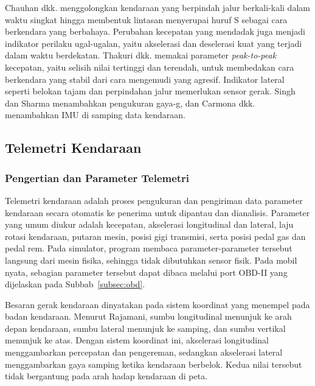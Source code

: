 Chauhan dkk. menggolongkan kendaraan yang berpindah jalur berkali-kali dalam waktu singkat hingga membentuk lintasan menyerupai huruf S sebagai cara berkendara yang berbahaya. Perubahan kecepatan yang mendadak juga menjadi indikator perilaku ugal-ugalan, yaitu akselerasi dan deselerasi kuat yang terjadi dalam waktu berdekatan. Thakuri dkk. memakai parameter \textit{peak-to-peak} kecepatan, yaitu selisih nilai tertinggi dan terendah, untuk membedakan cara berkendara yang stabil dari cara mengemudi yang agresif. Indikator lateral seperti belokan tajam dan perpindahan jalur memerlukan sensor gerak. Singh dan Sharma menambahkan pengukuran gaya-g, dan Carmona dkk. menambahkan IMU di samping data kendaraan.

\subsection{Telemetri Kendaraan}
\subsubsection{Pengertian dan Parameter Telemetri}
Telemetri kendaraan adalah proses pengukuran dan pengiriman data parameter kendaraan secara otomatis ke penerima untuk dipantau dan dianalisis. Parameter yang umum diukur adalah kecepatan, akselerasi longitudinal dan lateral, laju rotasi kendaraan, putaran mesin, posisi gigi transmisi, serta posisi pedal gas dan pedal rem. Pada simulator, program membaca parameter-parameter tersebut langsung dari mesin fisika, sehingga tidak dibutuhkan sensor fisik. Pada mobil nyata, sebagian parameter tersebut dapat dibaca melalui port OBD-II yang dijelaskan pada Subbab~\ref{subsec:obd}.

Besaran gerak kendaraan dinyatakan pada sistem koordinat yang menempel pada badan kendaraan. Menurut Rajamani, sumbu longitudinal menunjuk ke arah depan kendaraan, sumbu lateral menunjuk ke samping, dan sumbu vertikal menunjuk ke atas. Dengan sistem koordinat ini, akselerasi longitudinal menggambarkan percepatan dan pengereman, sedangkan akselerasi lateral menggambarkan gaya samping ketika kendaraan berbelok. Kedua nilai tersebut tidak bergantung pada arah hadap kendaraan di peta.

